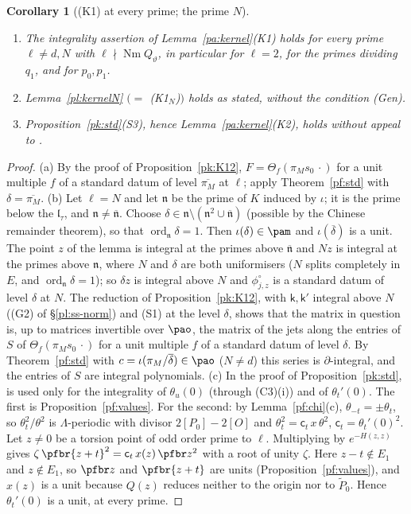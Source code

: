 \documentclass[10pt]{amsart}
\newtheorem{corollary}[theorem]{Corollary}
\theoremstyle{definition}
\theoremstyle{remark}
\providecommand{\auNm}{\operatorname{Nm}}
\providecommand{\aubar}[1]{\overline{#1}}
\begin{document}
\begin{corollary}[{\rm(K1)} at every prime; the prime $N$]\label{pf:K1}
\begin{enumerate}
\item[(a)] The integrality assertion of Lemma~\ref{pa:kernel}{\rm(K1)} holds for every prime
$\ell\ne d,N$ with $\ell\nmid\auNm Q_\vartheta$, in particular for $\ell=2$, for the primes
dividing $q_1$, and for $p_0,p_1$.
\item[(b)] Lemma~\ref{pl:kernelN} $(=$ {\rm(K1$_N$)}$)$ holds as stated, without the condition
{\rm(Gen)}.
\item[(c)] Proposition~\ref{pk:std}{\rm(S3)}, hence Lemma~\ref{pa:kernel}{\rm(K2)}, holds without
appeal to \cite{KubertLang}.
\end{enumerate}
\end{corollary}
\begin{proof}
(a) By the proof of Proposition~\ref{pk:K12}, $F=\Theta_f(\pi_Ms_0\,\cdot)$ for a unit multiple $f$
of a standard datum of level $\aubar{\pi_M}$ at $\ell$; apply Theorem~\ref{pf:std} with
$\delta=\aubar{\pi_M}$. (b) Let $\ell=N$ and let $\mathfrak n$ be the prime of $K$ induced by
$\iota$; it is the prime below the $\mathfrak l_\tau$, and $\mathfrak n\ne\aubar{\mathfrak n}$.
Choose $\delta\in\mathfrak n\setminus(\mathfrak n^2\cup\aubar{\mathfrak n})$ (possible by the Chinese remainder theorem), so that $\operatorname{ord}_{\mathfrak n}\delta=1$. Then $\iota(\delta)\in\pam$ and
$\iota(\aubar\delta)$ is a unit. The point $z$ of the lemma is integral at the primes above
$\aubar{\mathfrak n}$ and $Nz$ is integral at the primes above $\mathfrak n$, where $N$ and $\delta$
are both uniformisers ($N$ splits completely in $E$, and $\operatorname{ord}_{\mathfrak n}\delta=1$); so $\delta z$ is integral above $N$ and
$\phi^\circ_{j,z}$ is a standard datum of level $\delta$ at $N$. The reduction of
Proposition~\ref{pk:K12}, with $\mathsf k,\mathsf k'$ integral above $N$ ((G2) of
\S\ref{pl:ss-norm}) and (S1) at the level $\delta$, shows that the matrix in question is, up to
matrices invertible over $\pao$, the matrix of the jets along the entries of $S$ of
$\Theta_f(\pi_Ms_0\,\cdot)$ for a unit multiple $f$ of a standard datum of level $\delta$. By
Theorem~\ref{pf:std} with $c=\iota(\pi_M/\aubar\delta)\in\pao$ ($N\ne d$) this series is
$\partial$-integral, and the entries of $S$ are integral polynomials. (c) In the proof of
Proposition~\ref{pk:std}, \cite{KubertLang} is used only for the integrality of $\theta_u(0)$
(through (C3)(i)) and of $\theta_t'(0)$. The first is Proposition~\ref{pf:values}. For the second:
by Lemma~\ref{pf:chi}(c), $\theta_{-t}=\pm\theta_t$, so $\theta_t^2/\theta^2$ is $\Lambda$-periodic
with divisor $2[P_0]-2[O]$ and $\theta_t^2=\mathsf c_t\,x\,\theta^2$, $\mathsf c_t=\theta_t'(0)^2$.
Let $z\ne0$ be a torsion point of odd order prime to $\ell$. Multiplying by $e^{-H(z,z)}$ gives
$\zeta\,\pfbr{z+t}^2=\mathsf c_t\,x(z)\,\pfbr z^2$ with a root of unity $\zeta$. Here $z-t\notin
E_1$ and $z\notin E_1$, so $\pfbr z$ and $\pfbr{z+t}$ are units (Proposition~\ref{pf:values}), and
$x(z)$ is a unit because $Q(z)$ reduces neither to the origin nor to $\widetilde P_0$. Hence
$\theta_t'(0)$ is a unit, at every prime.
\end{proof}
\end{document}
